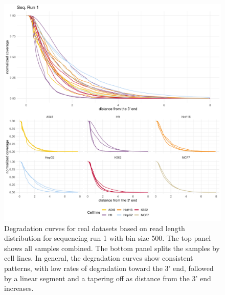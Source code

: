 \begin{figure}[p]
    \centering
    \includegraphics[width=\textwidth]{figures/sec-2-length-sgnex-curves.png}
    \caption[Degradation curves for real datasets based on read length distribution]{Degradation curves for real datasets based on read length distribution for sequencing run 1 with bin size 500. The top panel shows all samples combined. The bottom panel splits the samples by cell lines. In general, the degradation curves show consistent patterns, with low rates of degradation toward the 3' end, followed by a linear segment and a tapering off as distance from the 3' end increases.}
    \label{fig:length-sgnex-curves}
\end{figure}

